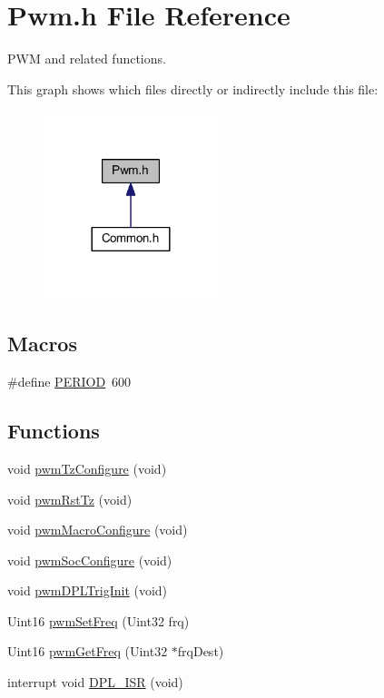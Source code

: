 \hypertarget{a00026}{\section{Pwm.\-h File Reference}
\label{a00026}
}


P\-W\-M and related functions.  


This graph shows which files directly or indirectly include this file\-:\nopagebreak
\begin{figure}[H]
\begin{center}
\leavevmode
\includegraphics[width=144pt]{a00052}
\end{center}
\end{figure}
\subsection*{Macros}
\begin{DoxyCompactItemize}
\item 
\#define \hyperlink{a00026_af281425e62298bac2df0fbe8690a4844}{P\-E\-R\-I\-O\-D}~600
\end{DoxyCompactItemize}
\subsection*{Functions}
\begin{DoxyCompactItemize}
\item 
void \hyperlink{a00026_aced17503c602f9e71a2d101e956cce23}{pwm\-Tz\-Configure} (void)
\item 
void \hyperlink{a00026_a94a47896496e094f8ab54c1cb46da2e1}{pwm\-Rst\-Tz} (void)
\item 
void \hyperlink{a00026_acc68120fcdfa36145370c31a61eb23a7}{pwm\-Macro\-Configure} (void)
\item 
void \hyperlink{a00026_a358d8706acd0faf4e1cc705129be6548}{pwm\-Soc\-Configure} (void)
\item 
void \hyperlink{a00026_adfbaf2bb56a0c9fe6f54826499cb57de}{pwm\-D\-P\-L\-Trig\-Init} (void)
\item 
Uint16 \hyperlink{a00026_af82e2c1ff72afc3de42eb172ca925956}{pwm\-Set\-Freq} (Uint32 frq)
\item 
Uint16 \hyperlink{a00026_a79f203a5167440096f2ba270813b6db2}{pwm\-Get\-Freq} (Uint32 $\ast$frq\-Dest)
\item 
interrupt void \hyperlink{a00026_a5532a53363218854b0e4b15049d773f7}{D\-P\-L\-\_\-\-I\-S\-R} (void)
\end{DoxyCompactItemize}
